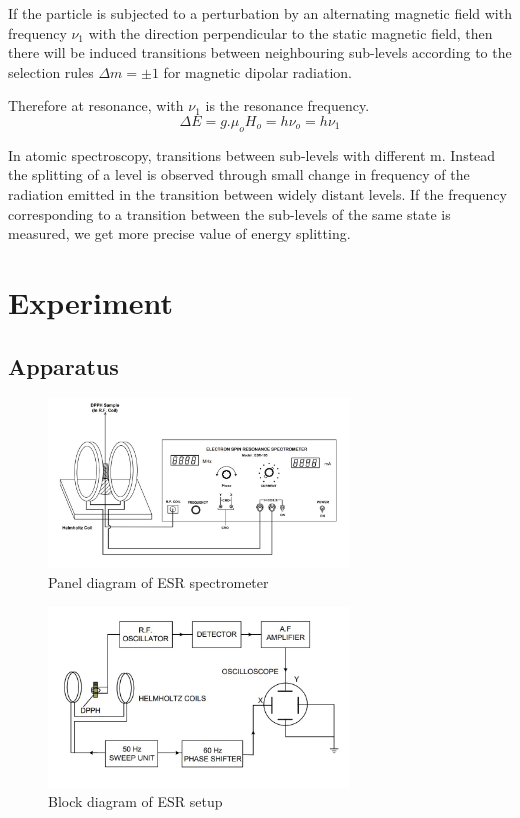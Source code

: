 \documentclass[a4paper, amsfonts, amssymb, amsmath, reprint, showkeys, nofootinbib, twoside]{revtex4-1}
\begin{document}
If the particle is subjected to a perturbation by an alternating magnetic field with frequency $\nu_1$ with the direction perpendicular to the static magnetic field, then 
there will be induced transitions between neighbouring sub-levels
according to the selection rules $\Delta m=\pm1$ for magnetic dipolar radiation. 

Therefore at resonance, with $\nu_1$ is the resonance frequency.
\begin{equation}\label{69}
\Delta E=g.\mu_o H_o=h\nu_o=h\nu_1
\end{equation}

In atomic spectroscopy, transitions between sub-levels with different m. Instead the splitting of a level is observed through small change in frequency of the radiation emitted in the transition between widely distant levels. If the frequency corresponding to a transition between the sub-levels of the same state is measured, we get more precise value of energy splitting.

\section{Experiment}

\subsection{Apparatus}
\begin{figure}[htbp] %
   \centering
   \includegraphics[width=8cm]{1} 
   \caption{Panel diagram of ESR spectrometer}
   \label{panel}
\end{figure}

\begin{figure}[htbp] %
   \centering
   \includegraphics[width=8cm]{2} 
   \caption{Block diagram of ESR setup}
   \label{blok}
\end{figure}
\end{document}
